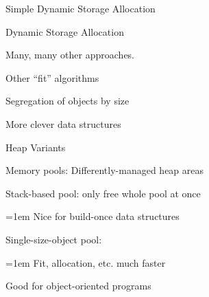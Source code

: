 \documentclass{plt}
\begin{document}
\begin{frame}[fragile]{Simple Dynamic Storage Allocation}

\end{frame}

\begin{frame}{Dynamic Storage Allocation}

Many, many other approaches.

Other ``fit'' algorithms

Segregation of objects by size

More clever data structures

\end{frame}

\begin{frame}{Heap Variants}

Memory pools: Differently-managed heap areas

Stack-based pool: only free whole pool at once

{\parindent=1em
Nice for build-once data structures
}

Single-size-object pool:

{\parindent=1em
Fit, allocation, etc. much faster

Good for object-oriented programs
}

\end{frame}
\end{document}

